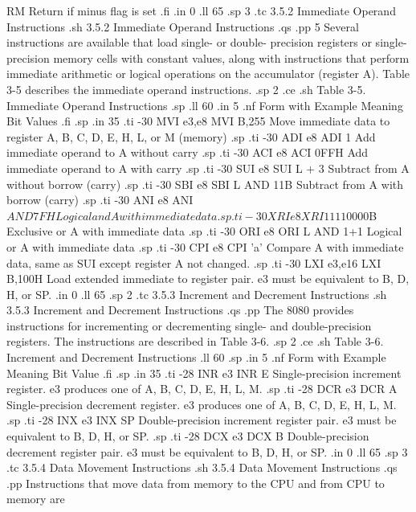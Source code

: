   RM                        Return if minus flag is set
.fi
.in 0
.ll 65
.sp 3
.tc         3.5.2  Immediate Operand Instructions
.sh
3.5.2  Immediate Operand Instructions
.qs
.pp 5
Several instructions are available that load single- or double-
precision registers or single-precision memory cells with 
constant values, along with instructions that perform immediate 
arithmetic or logical operations on the accumulator (register A).  
Table 3-5 describes the immediate operand instructions.
.sp 2
.ce
.sh
Table 3-5.  Immediate Operand Instructions
.sp
.ll 60
.in 5
.nf
Form with       Example                Meaning
Bit Values
.fi
.sp
.in 35
.ti -30
MVI e3,e8    MVI B,255        Move immediate data to register A, B, C, D,
E, H, L, or M (memory)
.sp
.ti -30
ADI e8       ADI 1            Add immediate operand to A without carry
.sp
.ti -30
ACI e8       ACI 0FFH         Add immediate operand to A with carry
.sp
.ti -30
SUI e8       SUI L + 3        Subtract from A without borrow (carry)
.sp
.ti -30
SBI e8       SBI L AND 11B    Subtract from A with borrow (carry)
.sp
.ti -30
ANI e8       ANI $ AND 7FH    Logical and A with immediate data
.sp
.ti -30
XRI e8       XRI 1111$0000B   Exclusive or A with immediate data
.sp
.ti -30
ORI e8       ORI L AND 1+1    Logical or A with immediate data
.sp
.ti -30
CPI e8       CPI 'a'          Compare A with immediate data, same
as SUI except register A not changed.
.sp
.ti -30
LXI e3,e16   LXI B,100H       Load extended immediate to register 
pair.  e3 must be equivalent to B, D, H, or SP.
.in 0
.ll 65
.sp 2
.tc         3.5.3  Increment and Decrement Instructions
.sh
3.5.3  Increment and Decrement Instructions
.qs
.pp
The 8080 provides instructions for incrementing or decrementing 
single- and double-precision registers.  The instructions are 
described in Table 3-6.
.sp 2
.ce
.sh
Table 3-6.  Increment and Decrement Instructions
.ll 60
.sp
.in 5
.nf
Form with         Example              Meaning
Bit Value
.fi
.sp
.in 35
.ti -28
INR e3          INR E       Single-precision increment 
register.  e3 produces one of A, B, C, D, E, H, L, M.
.sp
.ti -28
DCR e3          DCR A       Single-precision decrement 
register.  e3 produces one of A, B, C, D, E, H, L, M.
.sp
.ti -28
INX e3          INX SP      Double-precision increment register 
pair.  e3 must be equivalent to B, D, H, or SP.
.sp
.ti -28
DCX e3          DCX B       Double-precision decrement register 
pair.  e3 must be equivalent to B, D, H, or SP.
.in 0
.ll 65
.sp 3
.tc         3.5.4  Data Movement Instructions
.sh
3.5.4  Data Movement Instructions
.qs
.pp
Instructions that move data from memory to the CPU and from CPU to memory are
